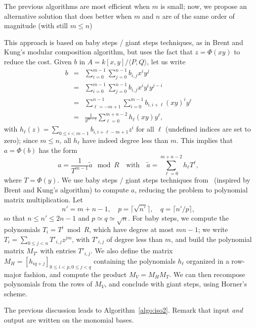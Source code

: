 \documentclass{sig-alternate}
\newcounter{algo}
\newcommand{\ang}[1]{\langle#1\rangle}
\begin{document}
  The previous
algorithms are most efficient when $m$ is small; now, we propose an
alternative solution that does better when $m$ and $n$ are of the same
order of magnitude (with still $m \le n$)

This approach is based on baby steps / giant steps techniques, as in
Brent and Kung's modular composition algorithm, but uses the fact that
$z=\Phi(xy)$ to reduce the cost. Given $b$ in $A=k[x,y]/\ang{P,Q}$,
let us write
\begin{eqnarray*}
b&=&\sum_{i=0}^{m-1}\sum_{j=0}^{n-1} b_{i,j}x^i y^j\\
&=&\sum_{i=0}^{m-1}\sum_{j=0}^{n-1} b_{i,j}x^i y^i y^{j-i}\\
&=&\sum_{\ell=-m+1}^{n-1}\sum_{i=0}^{m-1} b_{i,i+\ell}(xy)^i y^\ell\\
&=&\frac{1}{y^{m-1}} \sum_{\ell=0}^{m+n-2} h_\ell(xy) y^\ell,
\end{eqnarray*}
with $h_\ell(z)=\sum_{0 \le i < m-1} b_{i,i+\ell-m+1} z^i$ for all
$\ell$ (undefined indices are set to zero); since $m \le n$, all
$h_\ell$ have indeed degree less than $m$. This implies that
$a=\Phi(b)$ has the form
$$a = \frac{1}{T^{m-1}}\widetilde{a} \mod R\quad\text{with}\quad
\widetilde{a}=\sum_{\ell=0}^{m+n-2} h_\ell T^\ell,$$ where
$T=\Phi(y)$.  We use baby steps / giant steps techniques
from~\cite{LeMeSc13} (inspired by Brent and Kung's algorithm) to
compute $a$, reducing the problem to polynomial matrix
multiplication. Let
$$n'=m+n-1,\quad p=\lceil \sqrt {n'} \rceil,\quad q=\lceil
n'/p\rceil,$$ so that $n \le n' \le 2n-1$ and $p\simeq q \simeq
\sqrt{n}$.  For baby steps, we compute the polynomials $T_i=T^i \bmod
R$, which have degree at most $mn-1$; we write $T_i = \sum_{0 \le j <
  n} T'_{i,j} z^{jm}$, with $T'_{i,j}$ of degree less than $m$, and
build the polynomial matrix $M_{T'}$ with entries $T'_{i,j}$.  We also
define the matrix $M_H=[h_{iq+j}]_{0 \le i <p, 0 \le j < q}$
containing the polynomials $h_\ell$ organized in a row-major fashion,
and compute the product $M_V=M_H M_T$. We can then recompose
polynomials from the rows of $M_V$, and conclude with giant steps,
using Horner's scheme.

The previous discussion leads to Algorithm~\ref{algo:iso2}. Remark
that input {\em and} output are written on the monomial bases.
\end{document}
